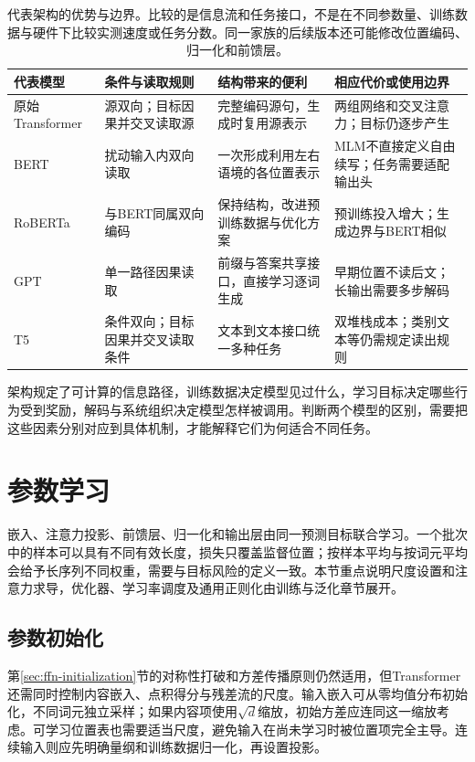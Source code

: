 \begin{table}[htbp]
  \centering
  \small
  \begin{tabular}{@{}p{24mm}p{34mm}p{47mm}p{50mm}@{}}
    \toprule
    代表模型 & 条件与读取规则 & 结构带来的便利 & 相应代价或使用边界 \\
    \midrule
    原始Transformer & 源双向；目标因果并交叉读取源 & 完整编码源句，生成时复用源表示 & 两组网络和交叉注意力；目标仍逐步产生 \\
    BERT & 扰动输入内双向读取 & 一次形成利用左右语境的各位置表示 & MLM不直接定义自由续写；任务需要适配输出头 \\
    RoBERTa & 与BERT同属双向编码 & 保持结构，改进预训练数据与优化方案 & 预训练投入增大；生成边界与BERT相似 \\
    GPT & 单一路径因果读取 & 前缀与答案共享接口，直接学习逐词生成 & 早期位置不读后文；长输出需要多步解码 \\
    T5 & 条件双向；目标因果并交叉读取条件 & 文本到文本接口统一多种任务 & 双堆栈成本；类别文本等仍需规定读出规则 \\
    \bottomrule
  \end{tabular}
  \caption{代表架构的优势与边界。比较的是信息流和任务接口，不是在不同参数量、训练数据与硬件下比较实测速度或任务分数。同一家族的后续版本还可能修改位置编码、归一化和前馈层。}
  \label{tab:transformer-common-architectures}
\end{table}
\FloatBarrier

架构规定了可计算的信息路径，训练数据决定模型见过什么，学习目标决定哪些行为受到奖励，解码与系统组织决定模型怎样被调用。判断两个模型的区别，需要把这些因素分别对应到具体机制，才能解释它们为何适合不同任务。


\section{参数学习}
\label{sec:transformer-learning}

嵌入、注意力投影、前馈层、归一化和输出层由同一预测目标联合学习。一个批次中的样本可以具有不同有效长度，损失只覆盖监督位置；按样本平均与按词元平均会给予长序列不同权重，需要与目标风险的定义一致。本节重点说明尺度设置和注意力求导，优化器、学习率调度及通用正则化由训练与泛化章节展开。

\subsection{参数初始化}
\label{sec:transformer-initialization}

第\ref{sec:ffn-initialization}节的对称性打破和方差传播原则仍然适用，但Transformer还需同时控制内容嵌入、点积得分与残差流的尺度。输入嵌入可从零均值分布初始化，不同词元独立采样；如果内容项使用$\sqrt d$缩放，初始方差应连同这一缩放考虑。可学习位置表也需要适当尺度，避免输入在尚未学习时被位置项完全主导。连续输入则应先明确量纲和训练数据归一化，再设置投影。

